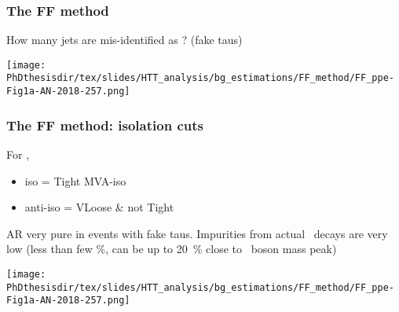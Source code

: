 \begin{frame}
\frametitle{The FF method}

\manip How many jets are mis-identified as \tauh? (fake taus)

\pause

\begin{center}
\texttt{[image: \\PhDthesisdir/tex/slides/HTT\_analysis/bg\_estimations/FF\_method/FF\_ppe-Fig1a-AN-2018-257.png]}
\end{center}
\end{frame}

\begin{frame}
\frametitle{The FF method: isolation cuts}

\begin{minipage}[c]{.45\textwidth}
For \tauh,
\begin{itemize}
\item iso = Tight MVA-iso
\item anti-iso = VLoose \& not Tight %
\end{itemize}

\manip AR very pure in events with fake taus.
\manip Impurities from actual \tauh\ decays are very low (less than few \%, can be up to \SI{20}{\%} close to \Zboson\ boson mass peak)
\end{minipage}
\hfill
\begin{minipage}[c]{.45\textwidth}
\vspace{\graphh}
\end{minipage}
\begin{minipage}[c]{.45\textwidth}
\begin{center}
\texttt{[image: \\PhDthesisdir/tex/slides/HTT\_analysis/bg\_estimations/FF\_method/FF\_ppe-Fig1a-AN-2018-257.png]}
\end{center}
\end{minipage}

\end{frame}

